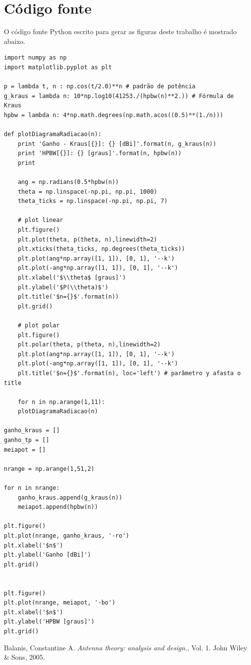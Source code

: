 \documentclass[a4paper,10pt]{article}
\begin{document}
\cleardoublepage
\section*{Código fonte}
O código fonte Python escrito para gerar as figuras deste trabalho é mostrado abaixo.

\begin{verbatim}
import numpy as np
import matplotlib.pyplot as plt

p = lambda t, n : np.cos(t/2.0)**n # padrão de potência 
g_kraus = lambda n: 10*np.log10(41253./(hpbw(n)**2.)) # Fórmula de Kraus
hpbw = lambda n: 4*np.math.degrees(np.math.acos((0.5)**(1./n)))

def plotDiagramaRadiacao(n):
    print 'Ganho - Kraus[{}]: {} [dBi]'.format(n, g_kraus(n))
    print 'HPBW[{}]: {} [graus]'.format(n, hpbw(n))
    print
    
    ang = np.radians(0.5*hpbw(n))
    theta = np.linspace(-np.pi, np.pi, 1000)
    theta_ticks = np.linspace(-np.pi, np.pi, 7)

    # plot linear
    plt.figure()
    plt.plot(theta, p(theta, n),linewidth=2)
    plt.xticks(theta_ticks, np.degrees(theta_ticks))
    plt.plot(ang*np.array([1, 1]), [0, 1], '--k')
    plt.plot(-ang*np.array([1, 1]), [0, 1], '--k')
    plt.xlabel('$\\theta$ [graus]')
    plt.ylabel('$P(\\theta)$')
    plt.title('$n={}$'.format(n))
    plt.grid()

    # plot polar
    plt.figure()
    plt.polar(theta, p(theta, n),linewidth=2)
    plt.plot(ang*np.array([1, 1]), [0, 1], '--k')
    plt.plot(-ang*np.array([1, 1]), [0, 1], '--k')
    plt.title('$n={}$'.format(n), loc='left') # parâmetro y afasta o title
    
    for n in np.arange(1,11):
    plotDiagramaRadiacao(n)
    
ganho_kraus = []
ganho_tp = []
meiapot = []

nrange = np.arange(1,51,2)

for n in nrange:
    ganho_kraus.append(g_kraus(n))
    meiapot.append(hpbw(n))
    
plt.figure()
plt.plot(nrange, ganho_kraus, '-ro')
plt.xlabel('$n$')
plt.ylabel('Ganho [dBi]')
plt.grid()


plt.figure()
plt.plot(nrange, meiapot, '-bo')
plt.xlabel('$n$')
plt.ylabel('HPBW [graus]')
plt.grid()
\end{verbatim}
\begin{thebibliography}{9}

  Balanis, Constantine A. 
  \emph{Antenna theory: analysis and design.},
  Vol. 1.
  John Wiley \& Sons, 2005.
\end{thebibliography}
\end{document}
